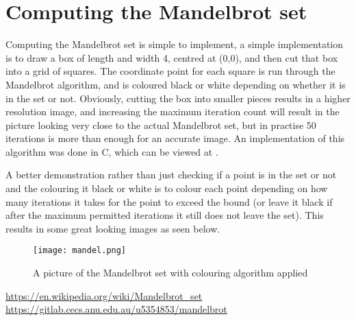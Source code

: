 \documentclass[a4paper,12pt]{article}
\begin{document}
\section{Computing the Mandelbrot set}
Computing the Mandelbrot set is simple to implement, a simple implementation is to draw a box of length and width 4, centred at (0,0), and then cut that box into a grid of squares. The coordinate point for each
square is run through the Mandelbrot algorithm, and is coloured black or white depending on whether it is in the set or not. Obviously, cutting the box into smaller pieces results in a higher resolution
image, and increasing the maximum iteration count will result in the picture looking very close to the actual Mandelbrot set, but in practise 50 iterations is more than enough for an accurate image.
An implementation of this algorithm was done in C, which can be viewed at \cite{git}.

A better demonstration rather than just checking if a point is in the set or not and the colouring it black or white is to colour each point depending on how many iterations it takes for the point
to exceed the bound (or leave it black if after the maximum permitted iterations it still does not leave the set). This results in some great looking images as seen below.

\begin{figure}[!ht]
	\centering
    \texttt{[image: mandel.png]}
    \caption{A picture of the Mandelbrot set with colouring algorithm applied}
    \label{fig:2}
\end{figure}





\begin{thebibliography}{99}

 \url{https://en.wikipedia.org/wiki/Mandelbrot_set}
 \url{https://gitlab.cecs.anu.edu.au/u5354853/mandelbrot}
\end{thebibliography}
\end{document}

